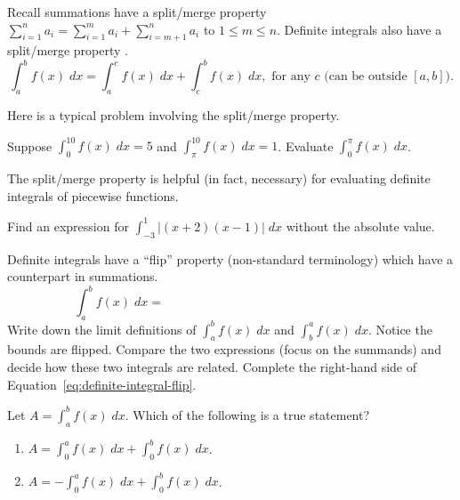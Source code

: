 \documentclass[../main.tex]{subfiles}
\begin{document}
  Recall summations have a split/merge property \(\sum_{i=1}^{n} a_{i} = \sum_{i=1}^{m} a_{i} + \sum_{i=m+1}^{n} a_{i}\)  to \(1 \le m \le n\).
  Definite integrals also have a split/merge property .
  \begin{equation} \label{eq:definite-integral-split}
    \int_{a}^{b} f(x) \;dx = \int_{a}^{c} f(x) \;dx + \int_{c}^{b} f(x) \;dx, \text{ for any } c \text{ (can be outside \([a,b]\)}).
  \end{equation}

  Here is a typical problem involving the split/merge property.
  \begin{example} \label{ex:definite-integral-split}
    Suppose \(\int_{0}^{10} f(x) \;dx = 5\) and \(\int_{\pi}^{10} f(x) \;dx = 1\).  Evaluate \(\int_{0}^{\pi} f(x) \;dx\).
  \end{example}

  The split/merge property is helpful (in fact, necessary) for evaluating definite integrals of piecewise functions.
  \begin{example}
    Find an expression for \(\int_{-3}^{1} |(x+2)(x-1)| \;dx \) without the absolute value. 

  \end{example}
  \vfill{}\clearpage

  Definite integrals have a ``flip'' property (non-standard terminology) which  have a counterpart in summations.
  \begin{equation} \label{eq:definite-integral-flip}
    \int_{a}^{b} f(x) \;dx = \hspace{3in}
  \end{equation}
  Write down the limit definitions of \(\int_{a}^{b} f(x) \;dx\) and \(\int_{b}^{a} f(x) \;dx\). Notice the bounds are flipped.
  Compare the two expressions (focus on the summands) and decide how these two integrals are related. Complete the right-hand side of Equation~\eqref{eq:definite-integral-flip}.

  \begin{example}
    Let \(A = \int_{a}^{b} f(x) \;dx\). Which of the following is a true statement?
    \begin{enumerate}[label=(\alph*)]
      \item \(A = \int_{0}^{a} f(x) \;dx + \int_{0}^{b} f(x) \;dx\).
      \item \(A = - \int_{0}^{a} f(x) \;dx + \int_{0}^{b} f(x) \;dx\).
    \end{enumerate}
    
  \end{example}
\end{document}
